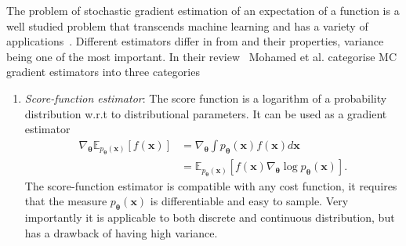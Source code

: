 The problem of stochastic gradient estimation of an expectation of a function is a well studied problem that transcends machine learning and has a variety of applications~\cite{chriss1997black, schrittwieser2020mastering}. Different estimators differ in from and their properties, variance being one of the most important. In their review~\cite{mohamed2020monte} Mohamed et al. categorise MC gradient estimators into three categories
\begin{enumerate}
	\item \emph{Score-function estimator}: The score function is a logarithm of a probability distribution w.r.t to distributional parameters. It can be used as a gradient estimator
	\begin{equation}
		\begin{aligned}
			\nabla_{\boldsymbol{\theta}} \mathbb{E}_{p_{\boldsymbol{\theta}}(\mathbf{x})}[f(\mathbf{x})] &=  \nabla_{\boldsymbol{\theta}} \int p_{\boldsymbol{\theta}}(\mathbf{x}) f(\mathbf{x}) d \mathbf{x} \\
			&= \mathbb{E}_{p_{\boldsymbol{\theta}}(\mathbf{x})}\left[f(\mathbf{x}) \nabla_{\boldsymbol{\theta}} \log p_{\boldsymbol{\theta}}(\mathbf{x})\right].
		\end{aligned}
	\end{equation}
	The score-function estimator is compatible with any cost function, it requires that the measure $p_{\boldsymbol{\theta}}(\mathbf{x})$ is differentiable and easy to sample. Very importantly it is applicable to both discrete and continuous distribution, but has a drawback of having high variance.
	

\end{enumerate}
